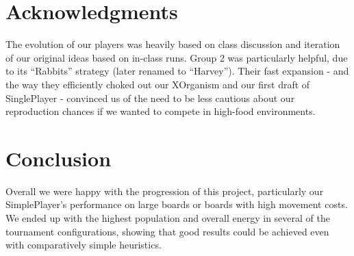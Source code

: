 \documentclass[
10pt, %
letterpaper, %
oneside, %
headinclude,footinclude, %
english
]{article}
\begin{document}
\section{Acknowledgments}

The evolution of our players was heavily based on class discussion and iteration of our original ideas based on in-class runs. Group 2 was particularly helpful, due to its ``Rabbits'' strategy (later renamed to ``Harvey''). Their fast expansion - and the way they efficiently choked out our XOrganism and our first draft of SinglePlayer - convinced us of the need to be less cautious about our reproduction chances if we wanted to compete in high-food environments.

\section{Conclusion}

Overall we were happy with the progression of this project, particularly our SimplePlayer's performance on large boards or boards with high movement costs. We ended up with the highest population and overall energy in several of the tournament configurations, showing that good results could be achieved even with comparatively simple heuristics.
\end{document}
